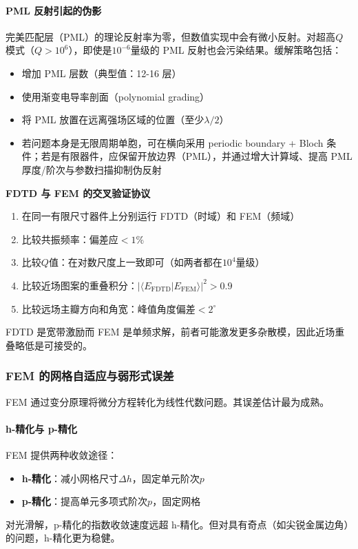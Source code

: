 \paragraph{PML 反射引起的伪影}
完美匹配层（PML）的理论反射率为零，但数值实现中会有微小反射。对超高$Q$模式（$Q>10^6$），即使是$10^{-6}$量级的 PML 反射也会污染结果。缓解策略包括：
\begin{itemize}
  \item 增加 PML 层数（典型值：12-16 层）
  \item 使用渐变电导率剖面（polynomial grading）
  \item 将 PML 放置在远离强场区域的位置（至少$\lambda/2$）
  \item 若问题本身是无限周期单胞，可在横向采用 periodic boundary + Bloch 条件；若是有限器件，应保留开放边界（PML），并通过增大计算域、提高 PML 厚度/阶次与参数扫描抑制伪反射
\end{itemize}

\begin{CrossValidationBox}
\textbf{FDTD 与 FEM 的交叉验证协议}
\begin{enumerate}
  \item 在同一有限尺寸器件上分别运行 FDTD（时域）和 FEM（频域）
  \item 比较共振频率：偏差应$<1\%$
  \item 比较$Q$值：在对数尺度上一致即可（如两者都在$10^4$量级）
  \item 比较近场图案的重叠积分：$|\langle E_{\text{FDTD}}|E_{\text{FEM}}\rangle|^2 > 0.9$
  \item 比较远场主瓣方向和角宽：峰值角度偏差$<2^\circ$
\end{enumerate}
FDTD 是宽带激励而 FEM 是单频求解，前者可能激发更多杂散模，因此近场重叠略低是可接受的。
\end{CrossValidationBox}

\subsubsection{FEM 的网格自适应与弱形式误差}
FEM 通过变分原理将微分方程转化为线性代数问题。其误差估计最为成熟。

\paragraph{h-精化与 p-精化}
FEM 提供两种收敛途径：
\begin{itemize}
  \item \textbf{h-精化}：减小网格尺寸$\Delta h$，固定单元阶次$p$
  \item \textbf{p-精化}：提高单元多项式阶次$p$，固定网格
\end{itemize}
对光滑解，p-精化的指数收敛速度远超 h-精化。但对具有奇点（如尖锐金属边角）的问题，h-精化更为稳健。

